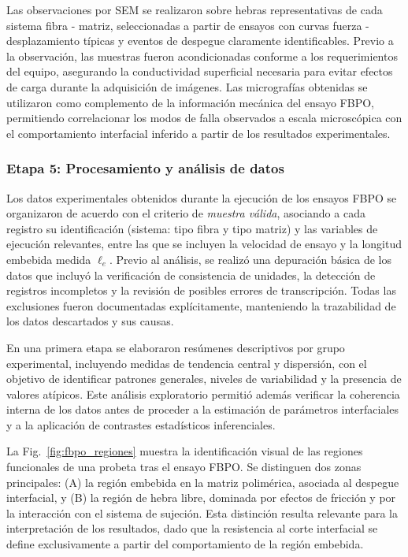 Las observaciones por SEM se realizaron sobre hebras representativas de cada sistema fibra - matriz,
seleccionadas a partir de ensayos con curvas fuerza - desplazamiento típicas y eventos de despegue
claramente identificables. Previo a la observación, las muestras fueron acondicionadas conforme
a los requerimientos del equipo, asegurando la conductividad superficial necesaria para evitar
efectos de carga durante la adquisición de imágenes. Las micrografías obtenidas se utilizaron
como complemento de la información mecánica del ensayo FBPO, permitiendo correlacionar los
modos de falla observados a escala microscópica con el comportamiento interfacial inferido a
partir de los resultados experimentales.

\subsubsection{Etapa 5: Procesamiento y análisis de datos}

Los datos experimentales obtenidos durante la ejecución de los ensayos FBPO se organizaron de
acuerdo con el criterio de \emph{muestra válida}, asociando a cada registro su identificación
(sistema: tipo fibra y tipo matriz) y las variables de ejecución relevantes, entre las que se
incluyen la velocidad de ensayo y la longitud embebida medida \(\ell_e\). Previo al análisis, se
realizó una depuración básica de los datos que incluyó la verificación de consistencia de
unidades, la detección de registros incompletos y la revisión de posibles errores de
transcripción. Todas las exclusiones fueron documentadas explícitamente, manteniendo la
trazabilidad de los datos descartados y sus causas.

En una primera etapa se elaboraron resúmenes descriptivos por grupo experimental, incluyendo
medidas de tendencia central y dispersión, con el objetivo de identificar patrones generales,
niveles de variabilidad y la presencia de valores atípicos. Este análisis exploratorio permitió
además verificar la coherencia interna de los datos antes de proceder a la estimación de
parámetros interfaciales y a la aplicación de contrastes estadísticos inferenciales.

La Fig.~\ref{fig:fbpo_regiones} muestra la identificación visual de las regiones
funcionales de una probeta tras el ensayo FBPO. Se distinguen dos zonas principales:
(A) la región embebida en la matriz polimérica, asociada al despegue interfacial, y
(B) la región de hebra libre, dominada por efectos de fricción y por la interacción con
el sistema de sujeción. Esta distinción resulta relevante para la interpretación de los
resultados, dado que la resistencia al corte interfacial se define exclusivamente a
partir del comportamiento de la región embebida.

